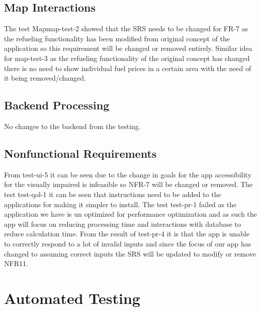 \documentclass[12pt, titlepage]{article}
\begin{document}
\subsection{Map Interactions}
The test Mapmap-test-2 showed that the SRS needs to be changed for FR-7 as the refueling functionality has been modified from 
original concept of the application so this requirement will be changed or removed entirely. Similar idea for map-test-3 as the 
refueling functionality of the original concept has changed there is no need to show individual fuel prices in a certain area 
with the need of it being removed/changed.

\subsection{Backend Processing}
No changes to the backend from the testing.

\subsection{Nonfunctional Requirements}
From test-ui-5 it can be seen due to the change in goals for the app accessibility for the visually impaired is infeasible so NFR-7 will 
be changed or removed. The test test-qol-1 it can be seen that instructions need to be added to the applications for making it simpler to 
install. The test test-pr-1 failed as the application we have is un optimized for performance optimization and as such the app will focus 
on reducing processing time and interactions with database to reduce calculation time. From the result of test-pr-4 it is that the app is 
unable to correctly respond to a lot of invalid inputs and since the focus of our app has changed to assuming correct inputs the SRS will 
be updated to modify or remove NFR11.

\section{Automated Testing}
\newpage
		
\end{document}

